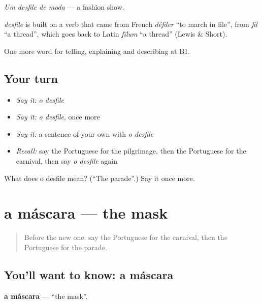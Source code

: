\emph{Um desfile de moda} — a fashion show.

\begin{cousinweb}
\emph{desfile} is built on a verb that came from French \emph{défiler} \textquotedblleft{}to march in file\textquotedblright{}, from \emph{fil} \textquotedblleft{}a thread\textquotedblright{}, which goes back to Latin \emph{fīlum} \textquotedblleft{}a thread\textquotedblright{} (Lewis \& Short).
\end{cousinweb}

\begin{grammarlens}[title={What you've built}]
One more word for telling, explaining and describing at B1.
\end{grammarlens}

\subsection*{Your turn}
\begin{itemize}
\raggedright
  \item \emph{Say it:} \emph{o desfile}
  \item \emph{Say it:} \emph{o desfile}, once more
  \item \emph{Say it:} a sentence of your own with \emph{o desfile}
  \item \emph{Recall:} say the Portuguese for the pilgrimage, then the Portuguese for the carnival, then say \emph{o desfile} again
\end{itemize}

\begin{tcolorbox}[breakable,colback=teal!4,colframe=teal!35!black,title={Before you move on}]
What does o desfile mean? (\textquotedblleft{}The parade\textquotedblright{}.) Say it once more.
\end{tcolorbox}
\section[a máscara]{a máscara — the mask}

\label{lesson:PT-C321-mascara}



\begin{quote}
Before the new one: say the Portuguese for the carnival, then the Portuguese for the parade.
\end{quote}

\subsection*{You'll want to know: a máscara}
\textbf{a máscara} — \textquotedblleft{}the mask\textquotedblright{}.

